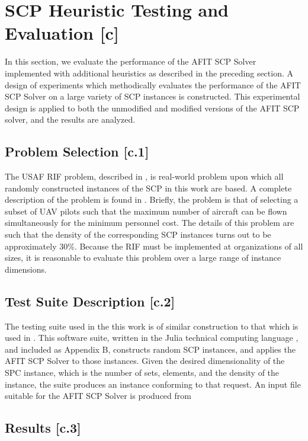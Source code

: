 \documentclass[12pt]{article}
\begin{document}
\section{SCP Heuristic Testing and Evaluation [c]} \label{scn:testing}

In this section, we evaluate the performance of the AFIT SCP Solver implemented with additional heuristics as described in the preceding section. A design of experiments which methodically evaluates the performance of the AFIT SCP Solver on a large variety of SCP instances is constructed. This experimental design is applied to both the unmodified and modified versions of the AFIT SCP solver, and the results are analyzed. 

\subsection{Problem Selection [c.1]} \label{scn:problem_selection}
The USAF RIF problem, described in \cite{hw5_knapp_fletcher_csce_686}, is real-world problem upon which all randomly constructed instances of the SCP in this work are based. A complete description of the problem is found in \cite{hw5_knapp_fletcher_csce_686}. Briefly, the problem is that of selecting a subset of UAV pilots such that the maximum number of aircraft can be flown simultaneously for the minimum personnel cost. The details of this problem are such that the density of the corresponding SCP instances turns out to be approximately $30\%$. Because the RIF must be implemented at organizations of all sizes, it is reasonable to evaluate this problem over a large range of instance dimensions.

\subsection{Test Suite Description [c.2]}

The testing suite used in the this work is of similar construction to that which is used in \cite{hw5_knapp_fletcher_csce_686}. This software suite, written in the Julia technical computing language \cite{Julia}, and included as Appendix B, constructs random SCP instances, and applies the AFIT SCP Solver to those instances. Given the desired dimensionality of the SPC instance, which is the number of sets, elements, and the density of the instance, the suite produces an instance conforming to that request. An input file suitable for the AFIT SCP Solver is produced from  

\subsection{Results [c.3]}
\end{document}
